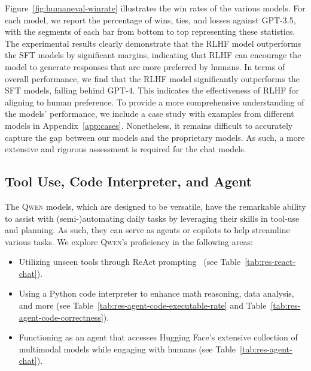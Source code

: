 Figure~\ref{fig:humaneval-winrate} illustrates the win rates of the various models. For each model, we report the percentage of wins, ties, and losses against GPT-3.5, with the segments of each bar from bottom to top representing these statistics. The experimental results clearly demonstrate that the RLHF model outperforms the SFT models by significant margins, indicating that RLHF can encourage the model to generate responses that are more preferred by humans. In terms of overall performance, we find that the RLHF model significantly outperforms the SFT models, falling behind GPT-4. This indicates the effectiveness of RLHF for aligning to human preference. To provide a more comprehensive understanding of the models' performance, we include a case study with examples from different models in Appendix~\ref{app:cases}.
Nonetheless, it remains difficult to accurately capture the gap between our models and the proprietary models. As such, a more extensive and rigorous assessment is required for the chat models.

\subsection{Tool Use, Code Interpreter, and Agent}\label{sec:tool_use}

The \textsc{Qwen} models, which are designed to be versatile, have the remarkable ability to assist with (semi-)automating daily tasks by leveraging their skills in tool-use and planning. As such, they can serve as agents or copilots to help streamline various tasks. We explore \textsc{Qwen}'s proficiency in the following areas:

\begin{itemize}
    \item Utilizing unseen tools through ReAct prompting~\citep{yao2022react} (see Table~\ref{tab:res-react-chat}).
    \item Using a Python code interpreter to enhance math reasoning, data analysis, and more (see Table~\ref{tab:res-agent-code-executable-rate} and Table~\ref{tab:res-agent-code-correctness}).
    \item Functioning as an agent that accesses Hugging Face's extensive collection of multimodal models while engaging with humans (see Table~\ref{tab:res-agent-chat}).
\end{itemize}

